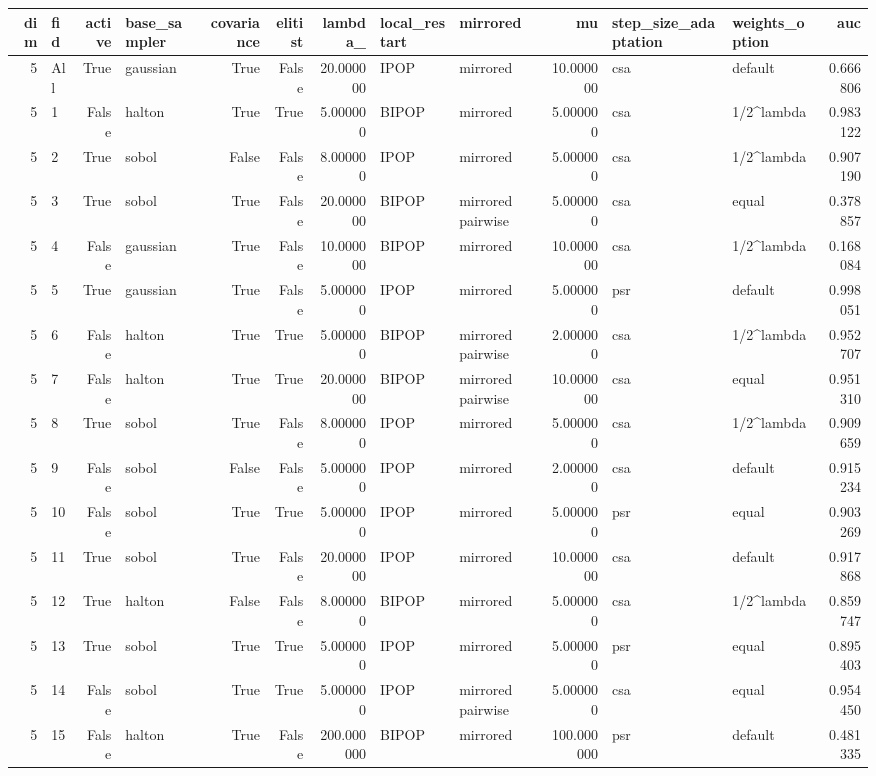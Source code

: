 \begin{tabular}{rlrlrrrllrllr}
\toprule
dim & fid & active & base_sampler & covariance & elitist & lambda_ & local_restart & mirrored & mu & step_size_adaptation & weights_option & auc \\
\midrule
5 & All & True & gaussian & True & False & 20.000000 & IPOP & mirrored & 10.000000 & csa & default & 0.666806 \\
5 & 1 & False & halton & True & True & 5.000000 & BIPOP & mirrored & 5.000000 & csa & 1/2^lambda & 0.983122 \\
5 & 2 & True & sobol & False & False & 8.000000 & IPOP & mirrored & 5.000000 & csa & 1/2^lambda & 0.907190 \\
5 & 3 & True & sobol & True & False & 20.000000 & BIPOP & mirrored pairwise & 5.000000 & csa & equal & 0.378857 \\
5 & 4 & False & gaussian & True & False & 10.000000 & BIPOP & mirrored & 10.000000 & csa & 1/2^lambda & 0.168084 \\
5 & 5 & True & gaussian & True & False & 5.000000 & IPOP & mirrored & 5.000000 & psr & default & 0.998051 \\
5 & 6 & False & halton & True & True & 5.000000 & BIPOP & mirrored pairwise & 2.000000 & csa & 1/2^lambda & 0.952707 \\
5 & 7 & False & halton & True & True & 20.000000 & BIPOP & mirrored pairwise & 10.000000 & csa & equal & 0.951310 \\
5 & 8 & True & sobol & True & False & 8.000000 & IPOP & mirrored & 5.000000 & csa & 1/2^lambda & 0.909659 \\
5 & 9 & False & sobol & False & False & 5.000000 & IPOP & mirrored & 2.000000 & csa & default & 0.915234 \\
5 & 10 & False & sobol & True & True & 5.000000 & IPOP & mirrored & 5.000000 & psr & equal & 0.903269 \\
5 & 11 & True & sobol & True & False & 20.000000 & IPOP & mirrored & 10.000000 & csa & default & 0.917868 \\
5 & 12 & True & halton & False & False & 8.000000 & BIPOP & mirrored & 5.000000 & csa & 1/2^lambda & 0.859747 \\
5 & 13 & True & sobol & True & True & 5.000000 & IPOP & mirrored & 5.000000 & psr & equal & 0.895403 \\
5 & 14 & False & sobol & True & True & 5.000000 & IPOP & mirrored pairwise & 5.000000 & csa & equal & 0.954450 \\
5 & 15 & False & halton & True & False & 200.000000 & BIPOP & mirrored & 100.000000 & psr & default & 0.481335 \\

\end{tabular}
